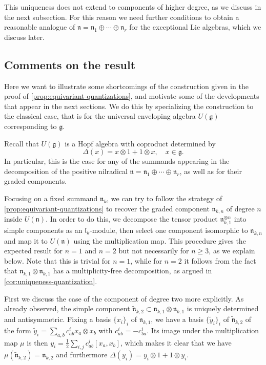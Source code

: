 \documentclass[a4paper, 12pt, reqno, english]{amsart}
\numberwithin{equation}{section}
\numberwithin{figure}{section}
\theoremstyle{plain}
\theoremstyle{plain}
\theoremstyle{plain}
\theoremstyle{plain}
\theoremstyle{plain}
\theoremstyle{definition}
\theoremstyle{definition}
\theoremstyle{definition}
\theoremstyle{remark}
\theoremstyle{definition}
\theoremstyle{definition}
\newcommand{\lieg}{\mathfrak{g}}
\newcommand{\liel}{\mathfrak{l}}
\newcommand{\lien}{\mathfrak{n}}
\begin{document}
This uniqueness does not extend to components of higher degree, as we discuss in the next subsection.
For this reason we need further conditions to obtain a reasonable analogue of $\lien = \lien_1 \oplus \cdots \oplus \lien_r$ for the exceptional Lie algebras, which we discuss later.

\subsection{Comments on the result}
\label{subsec:comments-result}

Here we want to illustrate some shortcomings of the construction given in the proof of \cref{prop:equivariant-quantizations}, and motivate some of the developments that appear in the next sections.
We do this by specializing the construction to the classical case, that is for the universal enveloping algebra $U(\lieg)$ corresponding to $\lieg$.

Recall that $U(\lieg)$ is a Hopf algebra with coproduct determined by
\[
\Delta(x) = x \otimes 1 + 1 \otimes x, \quad x \in \lieg.
\]
In particular, this is the case for any of the summands appearing in the decomposition of the positive nilradical $\lien = \lien_1 \oplus \cdots \oplus \lien_r$, as well as for their graded components.

Focusing on a fixed summand $\lien_k$, we can try to follow the strategy of \cref{prop:equivariant-quantizations} to recover the graded component $\lien_{k, n}$ of degree $n$ inside $U(\lien)$.
In order to do this, we decompose the tensor product $\lien_{k, 1}^{\otimes n}$ into simple components as an $\liel_k$-module, then select one component isomorphic to $\lien_{k, n}$ and map it to $U(\lien)$ using the multiplication map.
This procedure gives the expected result for $n = 1$ and $n = 2$ but not necessarily for $n \geq 3$, as we explain below.
Note that this is trivial for $n = 1$, while for $n = 2$ it follows from the fact that $\lien_{k, 1} \otimes \lien_{k, 1}$ has a multiplicity-free decomposition, as argued in \cref{cor:uniqueness-quantization}.

First we discuss the case of the component of degree two more explicitly.
As already observed, the simple component $\tilde{\lien}_{k, 2} \subset \lien_{k, 1} \otimes \lien_{k, 1}$ is uniquely determined and antisymmetric.
Fixing a basis $\{ x_i \}_i$ of $\lien_{k, 1}$, we have a basis $\{ \tilde{y}_i \}_i$ of $\tilde{\lien}_{k, 2}$ of the form $\tilde{y}_i = \sum_{a, b} c^i_{a b} x_a \otimes x_b$ with $c^i_{a b} = - c^i_{b a}$.
Its image under the multiplication map $\mu$ is then $y_i = \frac{1}{2} \sum_{i, j} c^i_{a b} [x_a, x_b]$, which makes it clear that we have $\mu(\tilde{\lien}_{k, 2}) = \lien_{k, 2}$ and furthermore $\Delta(y_i) = y_i \otimes 1 + 1 \otimes y_i$.
\end{document}
